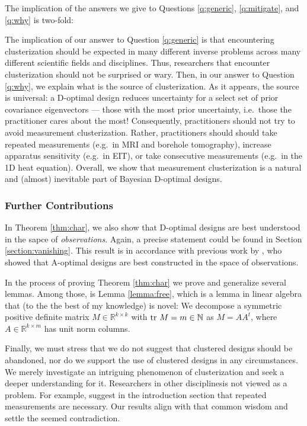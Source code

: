 The implication of the answers we give to Questions \ref{q:generic},
\ref{q:mitigate}, and \ref{q:why} is two-fold:

The implication of our answer to Question \ref{q:generic} is that
encountering clusterization should be expected in many different
inverse problems across many different scientific fields and
disciplines. Thus, researchers that encounter clusterization should
not be surprised or wary. Then, in our answer to Question \ref{q:why},
we explain what is the source of clusterization. As it appears, the
source is universal: a D-optimal design reduces uncertainty for a
select set of prior covariance eigenvectors --- those with the most
prior uncertainty, i.e.~those the practitioner cares about the most!
Consequently, practitioners should not try to avoid measurement
clusterization. Rather, practitioners should should take repeated
measurements (e.g.~in MRI and borehole tomography), increase apparatus
sensitivity (e.g.~in EIT), or take consecutive measurements (e.g.~in
the 1D heat equation). Overall, we show that measurement
clusterization is a natural and (almost) inevitable part of Bayesian
D-optimal designs.


\subsubsection{Further Contributions}
In Theorem \ref{thm:char}, we also show that D-optimal designs are
best understood in the sapce of \emph{observations}. Again, a precise
statement could be found in Section \ref{section:vanishing}.  This
result is in accordance with previous work by \cite{koval2020}, who
showed that A-optimal designs are best constructed in the space of
observations.

In the process of proving Theorem \ref{thm:char} we prove and
generalize several lemmas. Among those, is Lemma \ref{lemma:free},
which is a lemma in linear algebra that (to the the best of my
knowledge) is novel: We decompose a symmetric positive definite matrix
\(M \in \mathbb{R}^{k \times k}\) with \(\textup{tr}\ M = m \in \mathbb{N}\)
as \(M = AA^t\), where \(A\in \mathbb{R}^{k \times m}\) has unit norm
columns.


Finally, we must stress that we do not suggest that clustered designs
should be abandoned, nor do we support the use of clustered designs in
any circumstances. We merely investigate an intriguing phenomenon of
clusterization and seek a deeper understanding for it. Researchers in
other disciplinesis not viewed as a problem. For example, \cite{lozan}
suggest in the introduction section that repeated measurements are
necessary. Our results align with that common wisdom and settle the
seemed contradiction.


